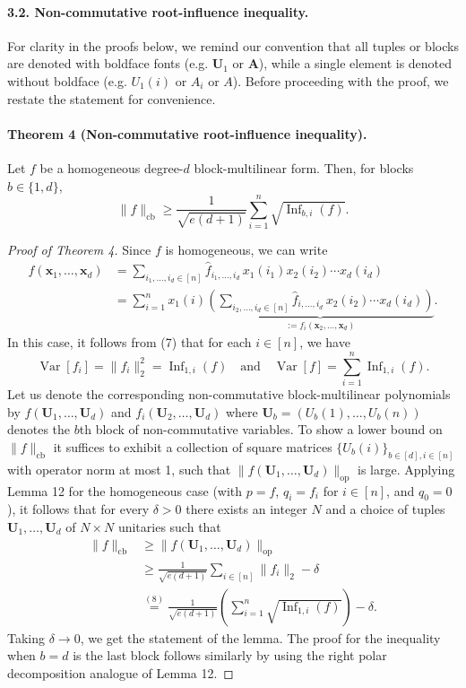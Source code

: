 \documentclass[10pt,a4paper]{article}
\begin{document}
\paragraph{3.2. Non-commutative root-influence inequality.}
For clarity in the proofs below, we remind our convention that all tuples or blocks are denoted with boldface fonts (e.g. $\mathbf U_1$ or $\mathbf A$), while a single element is denoted without boldface (e.g. $U_1(i)$ or $A_i$ or $A$). Before proceeding with the proof, we restate the statement for convenience.
\paragraph{Theorem 4 (Non-commutative root-influence inequality).}
Let $f$ be a homogeneous degree-$d$ block-multilinear form. Then, for blocks $b\in\{1,d\}$,
\[\|f\|_{\mathrm{cb}}\geq\frac1{\sqrt{e(d+1)}}\sum_{i=1}^n\sqrt{\operatorname{Inf}_{b,i}(f)}.\]
\begin{proof}[Proof of Theorem 4]
Since $f$ is homogeneous, we can write
\begin{align*}
f(\mathbf x_1,\ldots,\mathbf x_d)
&=\sum_{i_1,\ldots,i_d\in[n]}\widehat f_{i_1,\ldots,i_d}\,x_1(i_1)x_2(i_2)\cdots x_d(i_d)\\
&=\sum_{i=1}^nx_1(i)\underbrace{\left(\sum_{i_2,\ldots,i_d\in[n]}\widehat f_{i,\ldots,i_d}\,x_2(i_2)\cdots x_d(i_d)\right)}_{:=f_i(\mathbf x_2,\ldots,\mathbf x_d)}.
\end{align*}
In this case, it follows from (7) that for each $i\in[n]$, we have
\[\operatorname{Var}[f_i]=\|f_i\|_2^2=\operatorname{Inf}_{1,i}(f)\quad\text{and}\quad\operatorname{Var}[f]=\sum_{i=1}^n\operatorname{Inf}_{1,i}(f).\tag{8}\]
Let us denote the corresponding non-commutative block-multilinear polynomials by $f(\mathbf U_1,\ldots,\mathbf U_d)$ and $f_i(\mathbf U_2,\ldots,\mathbf U_d)$ where $\mathbf U_b=(U_b(1),\ldots,U_b(n))$ denotes the $b$th block of non-commutative variables. To show a lower bound on $\|f\|_{\mathrm{cb}}$ it suffices to exhibit a collection of square matrices $\{U_b(i)\}_{b\in[d],i\in[n]}$ with operator norm at most 1, such that $\|f(\mathbf U_1,\ldots,\mathbf U_d)\|_{\mathrm{op}}$ is large.
Applying Lemma 12 for the homogeneous case (with $p=f$, $q_i=f_i$ for $i\in[n]$, and $q_0=0$), it follows that for every $\delta>0$ there exists an integer $N$ and a choice of tuples $\mathbf U_1,\ldots,\mathbf U_d$ of $N\times N$ unitaries such that
\begin{align*}
\|f\|_{\mathrm{cb}}&\geq\|f(\mathbf U_1,\ldots,\mathbf U_d)\|_{\mathrm{op}}\\
&\geq\frac1{\sqrt{e(d+1)}}\sum_{i\in[n]}\|f_i\|_2-\delta\\
&\overset{(8)}=\frac1{\sqrt{e(d+1)}}\left(\sum_{i=1}^n\sqrt{\operatorname{Inf}_{1,i}(f)}\right)-\delta.
\end{align*}
Taking $\delta\to0$, we get the statement of the lemma. The proof for the inequality when $b=d$ is the last block follows similarly by using the right polar decomposition analogue of Lemma 12.
\end{proof}
\end{document}

